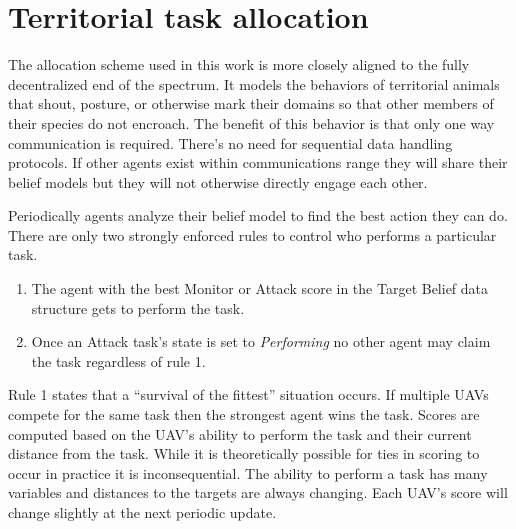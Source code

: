 

\section{Territorial task allocation}
\label{sec:uncoordTaskingMyWork}
The allocation scheme used in this work is more closely aligned to the fully decentralized end of the spectrum.  It models the behaviors of territorial animals that shout, posture, or otherwise mark their domains so that other members of their species do not encroach.  The benefit of this behavior is that only one way communication is required.  There's no need for sequential data handling protocols.  If other agents exist within communications range they will share their belief models but they will not otherwise directly engage each other.  

Periodically agents analyze their belief model to find the best action they can do.  There are only two strongly enforced rules to control who performs a particular task.  

\begin{enumerate}
	\item The agent with the best Monitor or Attack score in the Target Belief data structure gets to perform the task.
	\item Once an Attack task's state is set to \textit{Performing} no other agent may claim the task regardless of rule 1.
\end{enumerate}

Rule 1 states that a ``survival of the fittest'' situation occurs.  If multiple UAVs compete for the same task then the strongest agent wins the task.  Scores are computed based on the UAV's ability to perform the task and their current distance from the task.  While it is theoretically possible for ties in scoring to occur in practice it is inconsequential.  The ability to perform a task has many variables and distances to the targets are always changing.  Each UAV's score will change slightly at the next periodic update.

